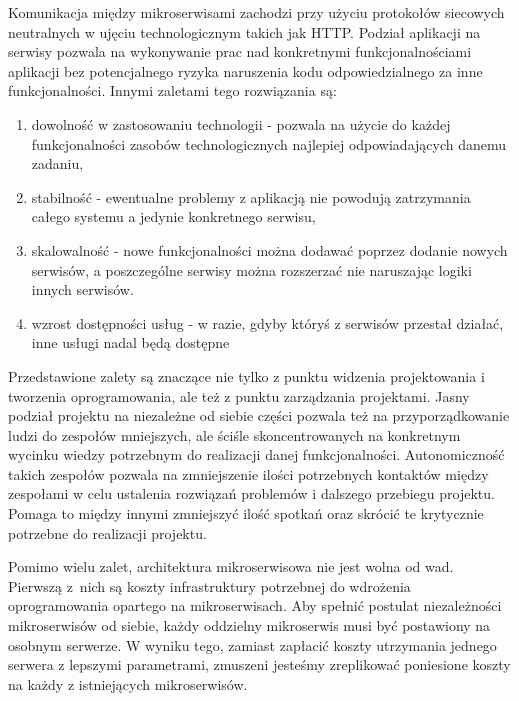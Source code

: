 \documentclass{SGGW-thesis}
\begin{document}

  Komunikacja między mikroserwisami zachodzi przy użyciu protokołów siecowych neutralnych w ujęciu technologicznym takich jak HTTP. Podział aplikacji na serwisy pozwala na wykonywanie prac nad konkretnymi funkcjonalnościami aplikacji bez potencjalnego ryzyka naruszenia kodu odpowiedzialnego za inne funkcjonalności. Innymi zaletami tego rozwiązania są:

  \begin{enumerate}
    \item dowolność w zastosowaniu technologii - pozwala na użycie do każdej funkcjonalności zasobów technologicznych najlepiej odpowiadających danemu zadaniu,
    \item stabilność - ewentualne problemy z aplikacją nie powodują zatrzymania całego systemu a jedynie konkretnego serwisu,
    \item skalowalność - nowe funkcjonalności można dodawać poprzez dodanie nowych serwisów, a poszczególne serwisy można rozszerzać nie naruszając logiki innych serwisów.
    \item wzrost dostępności usług - w razie, gdyby któryś z serwisów przestał działać, inne usługi nadal będą dostępne 
  \end{enumerate}

  Przedstawione zalety są znaczące nie tylko z punktu widzenia projektowania i tworzenia oprogramowania, ale też z punktu zarządzania projektami. Jasny podział projektu na niezależne od siebie części pozwala też na przyporządkowanie ludzi do zespołów mniejszych, ale ściśle skoncentrowanych na konkretnym wycinku wiedzy potrzebnym do realizacji danej funkcjonalności. 
  Autonomiczność takich zespołów pozwala na zmniejszenie ilości potrzebnych kontaktów między zespołami w celu ustalenia rozwiązań problemów i dalszego przebiegu projektu. Pomaga to między innymi zmniejszyć ilość spotkań oraz skrócić te krytycznie potrzebne do realizacji projektu.
  
  Pomimo wielu zalet, architektura mikroserwisowa nie jest wolna od wad. Pierwszą z~nich są koszty infrastruktury potrzebnej do wdrożenia oprogramowania opartego na mikroserwisach. Aby spełnić postulat niezależności mikroserwisów od siebie, każdy oddzielny mikroserwis musi być postawiony na osobnym serwerze. W wyniku tego, zamiast zapłacić koszty utrzymania jednego serwera z lepszymi parametrami, zmuszeni jesteśmy zreplikować poniesione koszty na każdy z istniejących mikroserwisów. 
  
\end{document}
